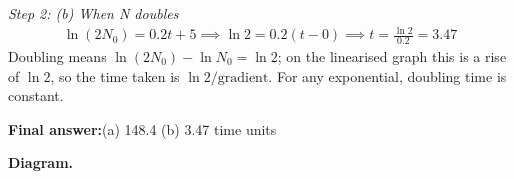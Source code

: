 \documentclass[11pt]{article}
\begin{document}
\textit{Step 2: (b) When N doubles}
\[\begin{gathered}
\ln(2N_0) = 0.2t + 5 \implies \ln 2 = 0.2(t - 0) \implies t = \frac{\ln 2}{0.2} = 3.47
\end{gathered}\]
Doubling means \( \ln(2N_{0}) - \ln N_{0} = \ln 2 \); on the linearised graph this is a rise of \( \ln 2 \), so the time taken is \( \ln 2 / \text{gradient} \). For any exponential, doubling time is constant.

\begin{answerbox}
\textbf{Final answer:}\quad (a) 148.4 (b) 3.47 time units
\end{answerbox}
\textbf{Diagram.}

\begin{center}
\end{center}
\end{document}
